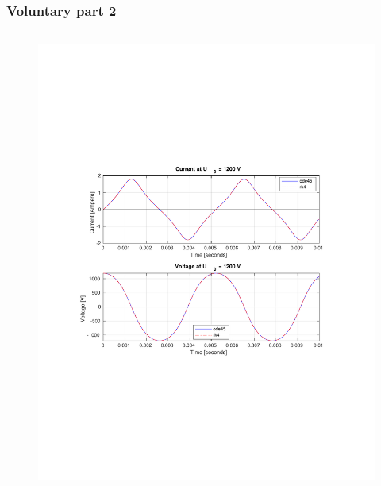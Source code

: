 \documentclass[aspectratio=1610]{beamer}
\begin{document}
\begin{frame}
\frametitle{Voluntary part 2}
	\begin{columns}
			\begin{figure}
				\includegraphics[scale=0.7]{figs/voluntary_2_1200.pdf}
			\end{figure}
	\end{columns}
\end{frame}
\end{document}
